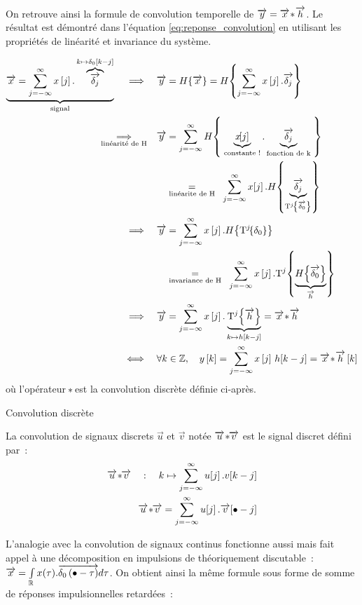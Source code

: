 On retrouve ainsi la formule de convolution temporelle de
$\overrightarrow{y}=\overrightarrow{x}\!\ast\! \overrightarrow{h}$. Le résultat est démontré dans l'équation
\eqref{eq:reponse_convolution} en utilisant les propriétés de
linéarité et invariance du système.


\begin{align}
  \label{eq:reponse_convolution}
  \caCest{\x = \somme{j=-\infty}{\infty}{x\b{j}.\overbrace{\dj}^{k\mapsto \delta_0\b{k-j}}}}{\text{signal}}\quad \implies\quad &\y=H\OperDe{\x}=H\OperDe{\somme{j=-\infty}{\infty}{x\b{j}.\dj}} \nonumber\\
  \underset{\text{linéarité de H}}{\implies}\quad &\y=\somme{j=-\infty}{\infty}{H\OperDe{ \;\caCest{x\!\!\b{j}}{\text{constante !}}.\caCest{\dj}{\text{fonction de k}}\;}} \\
  & \quad\underset{\text{linéarite de H}}{=} \;\;\somme{j=-\infty}{\infty}{x\!\b{j}.H\OperDe{\caCest{\dj}{\oret^j\OperDe{\d0}}}} \nonumber \\
  \implies \quad &\y=\somme{j=-\infty}{\infty}{x\b{j}.H\OperDe{\oret^j\!\OperDe{\delta_{0}}}} \\
  &\quad \underset{\text{invariance de H}}{=} \;\;\somme{j=-\infty}{\infty}{x\b{j}.\oret^j\OperDe{\caCest{H\OperDe{\d0}}{\h}}}\nonumber\\
  \implies \quad & \y= \somme{j=-\infty}{\infty}{x\b{j}.\caCest{\oret^j\OperDe{\h}}{k\mapsto h\b{k-j}}}=\x\conv \h \nonumber\\
  \iff \quad & \forall k\in\Z,\quad  y\b{k}= \somme{j=-\infty}{\infty}{x\b{j}\,h\!\b{k-j}} = \x\conv \h\b{k}
\end{align}
où l'opérateur $\!\ast\!$ est la convolution discrète définie ci-après.

\begin{definition}{Convolution discrète}
  \label{def:convolution_discrete}
  
  La convolution de signaux discrets $\vec{u}$ et $\vec{v}$ notée $\overrightarrow{u}\!\ast\!\!\overrightarrow{v}$ est le
  signal discret défini par~:
  \begin{align}
    \label{eq:convolution_discrete}
    \vec{u}\conv\!\vec{v} \quad : \quad k \mapsto \somme{j=-\infty}{\infty}{u\ded{j}.v\ded{k-j}} \\
    \vec{u}\conv\!\vec{v} = \somme{j=-\infty}{\infty}{u\ded{j}.\vec{v}\ded{\bullet-j}} \nonumber
  \end{align}
\end{definition}


L'analogie avec la convolution de signaux continus fonctionne aussi
mais fait appel à une décomposition en impulsions de \Dirac{}
théoriquement discutable~:
$\overrightarrow{x} =\int\limits_{\mathbb{R}}^{}{x(\tau).\overrightarrow{\delta_0\left(\bullet-\tau\right)}d\tau}$.
 On obtient ainsi la même formule sous forme de somme de réponses impulsionnelles retardées~:


